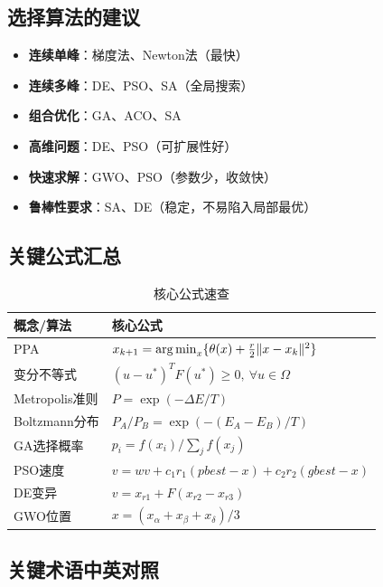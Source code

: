 \subsection{选择算法的建议}

\begin{notebox}[算法选择指南]
\begin{itemize}[itemsep=0.3em]
    \item \textbf{连续单峰}：梯度法、Newton法（最快）
    \item \textbf{连续多峰}：DE、PSO、SA（全局搜索）
    \item \textbf{组合优化}：GA、ACO、SA
    \item \textbf{高维问题}：DE、PSO（可扩展性好）
    \item \textbf{快速求解}：GWO、PSO（参数少，收敛快）
    \item \textbf{鲁棒性要求}：SA、DE（稳定，不易陷入局部最优）
\end{itemize}
\end{notebox}

\subsection{关键公式汇总}

\begin{table}[htbp]
\centering
\caption{核心公式速查}
\begin{tabular}{@{}ll@{}}
\toprule
\textbf{概念/算法} & \textbf{核心公式} \\
\midrule
PPA & $x_{k+1} = \operatorname{arg\,min}_x\{\theta(x) + \frac{r}{2}\|x-x_k\|^2\}$ \\
变分不等式 & $(u-u^*)^T F(u^*) \geq 0,\ \forall u \in \Omega$ \\
Metropolis准则 & $P = \exp(-\Delta E / T)$ \\
Boltzmann分布 & $P_A/P_B = \exp(-(E_A-E_B)/T)$ \\
GA选择概率 & $p_i = f(x_i) / \sum_j f(x_j)$ \\
PSO速度 & $v = wv + c_1 r_1(pbest-x) + c_2 r_2(gbest-x)$ \\
DE变异 & $v = x_{r1} + F(x_{r2} - x_{r3})$ \\
GWO位置 & $x = (x_\alpha + x_\beta + x_\delta)/3$ \\
\bottomrule
\end{tabular}
\end{table}

\subsection{关键术语中英对照}

